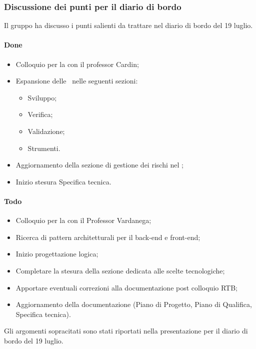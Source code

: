 \subsubsection{Discussione dei punti per il diario di bordo}
\par Il gruppo ha discusso i punti salienti da trattare nel diario di bordo del 19 luglio.
\paragraph{Done}
\begin{itemize}
	\item Colloquio per la  con il professor Cardin;
	\item Espansione delle \NdP\ nelle seguenti sezioni:
	\begin{itemize}
		\item Sviluppo;
		\item Verifica; 
		\item Validazione;
		\item Strumenti.
	\end{itemize}
	\item Aggiornamento della sezione di gestione dei rischi nel \PdP;
	\item Inizio stesura Specifica tecnica.
\end{itemize}

\paragraph{Todo}
\begin{itemize}
	\item Colloquio per la  con il Professor Vardanega;
	\item Ricerca di pattern architetturali per il back-end e front-end;
	\item Inizio progettazione logica;
	\item Completare la stesura della sezione dedicata alle scelte tecnologiche;
	\item Apportare eventuali correzioni alla documentazione post colloquio RTB;
	\item Aggiornamento della documentazione (Piano di Progetto, Piano di Qualifica, Specifica tecnica).
\end{itemize}

\vspace{0.5\baselineskip}
\par Gli argomenti sopracitati sono stati riportati nella presentazione per il diario di bordo del 19 luglio.